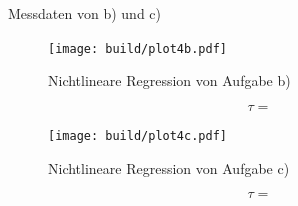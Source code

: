   \begin{table}
        \centering
        \caption{Messdaten von b) und c)}
         
        \label{tab:data}
  \end{table}

  \begin{figure}[H]
    \texttt{[image: build/plot4b.pdf]}
    \centering
    \caption{Nichtlineare Regression von Aufgabe b)}
    \label{fig:4b}
  \end{figure}

  \begin{equation}
  \tau = \text{}
  \end{equation}


  \begin{figure}[H]
    \texttt{[image: build/plot4c.pdf]}
    \centering
    \caption{Nichtlineare Regression von Aufgabe c)}
    \label{fig:4c}
  \end{figure}

  \begin{equation}
  \tau = \text{}
  \end{equation}


